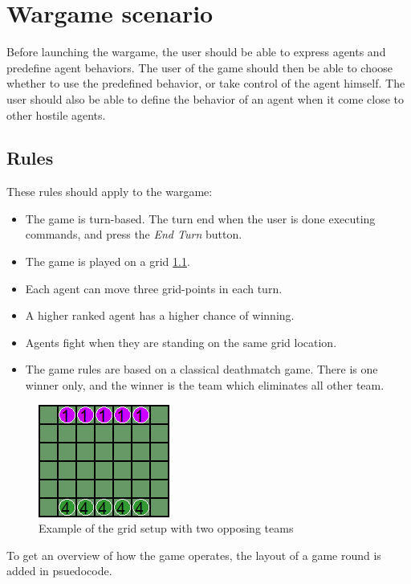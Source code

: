 \chapter{Wargame scenario}

Before launching the wargame, the user should be able to express agents and predefine agent behaviors. The user of the game should then be able to choose whether to use the predefined behavior, or take control of the agent himself. The user should also be able to define the behavior of an agent when it come close to other hostile agents. \\

\section{Rules}
These rules should apply to the wargame:
\begin{itemize}
	\item The game is turn-based. The turn end when the user is done executing commands, and press the \textit{End Turn} button.
	\item The game is played on a grid \ref{fig:ex_grid}.
	\item Each agent can move three grid-points in each turn.
	\item A higher ranked agent has a higher chance of winning.
	\item Agents fight when they are standing on the same grid location.
	\item The game rules are based on a classical deathmatch game. There is one winner only, and the winner is the team which eliminates all other team.
\end{itemize}

\begin{figure}[H]
\begin{center}
\includegraphics[scale=0.9]{Images/ex_grid.png}
\end{center}
\caption{Example of the grid setup with two opposing teams}
\label{fig:ex_grid}
\end{figure}

To get an overview of how the game operates, the layout of a game round is added in psuedocode.

